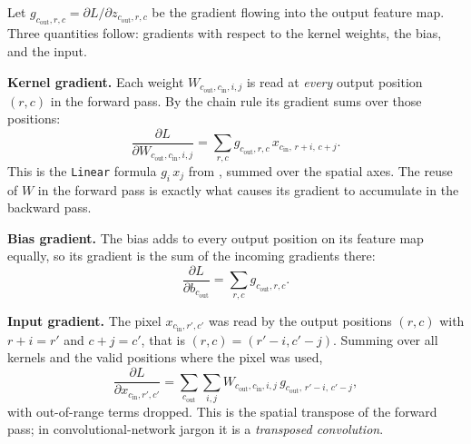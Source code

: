 Let $g_{c_{\text{out}}, r, c} = \partial L / \partial z_{c_{\text{out}}, r,
c}$ be the gradient flowing into the output feature map. Three quantities
follow: gradients with respect to the kernel weights, the bias, and the
input.

\textbf{Kernel gradient.} Each weight $W_{c_{\text{out}}, c_{\text{in}}, i,
j}$ is read at \emph{every} output position $(r, c)$ in the forward pass. By
the chain rule its gradient sums over those positions:
\begin{equation}\label{eq:conv-grad}
  \frac{\partial L}{\partial W_{c_{\text{out}}, c_{\text{in}}, i, j}}
  = \sum_{r, c} g_{c_{\text{out}}, r, c}\,
                x_{c_{\text{in}},\, r+i,\, c+j}.
\end{equation}
This is the \texttt{Linear} formula $g_i\, x_j$ from ,
summed over the spatial axes. The reuse of $W$ in the forward pass is exactly
what causes its gradient to accumulate in the backward pass.

\textbf{Bias gradient.} The bias adds to every output position on its feature
map equally, so its gradient is the sum of the incoming gradients there:
\[
  \frac{\partial L}{\partial b_{c_{\text{out}}}}
  = \sum_{r, c} g_{c_{\text{out}}, r, c}.
\]

\textbf{Input gradient.} The pixel $x_{c_{\text{in}}, r', c'}$ was read by the
output positions $(r, c)$ with $r + i = r'$ and $c + j = c'$, that is $(r, c)
= (r' - i, c' - j)$. Summing over all kernels and the valid positions where
the pixel was used,
\[
  \frac{\partial L}{\partial x_{c_{\text{in}}, r', c'}}
  = \sum_{c_{\text{out}}} \sum_{i, j}
    W_{c_{\text{out}}, c_{\text{in}}, i, j}\,
    g_{c_{\text{out}},\, r'-i,\, c'-j},
\]
with out-of-range terms dropped. This is the spatial transpose of the forward
pass; in convolutional-network jargon it is a \emph{transposed convolution}.

